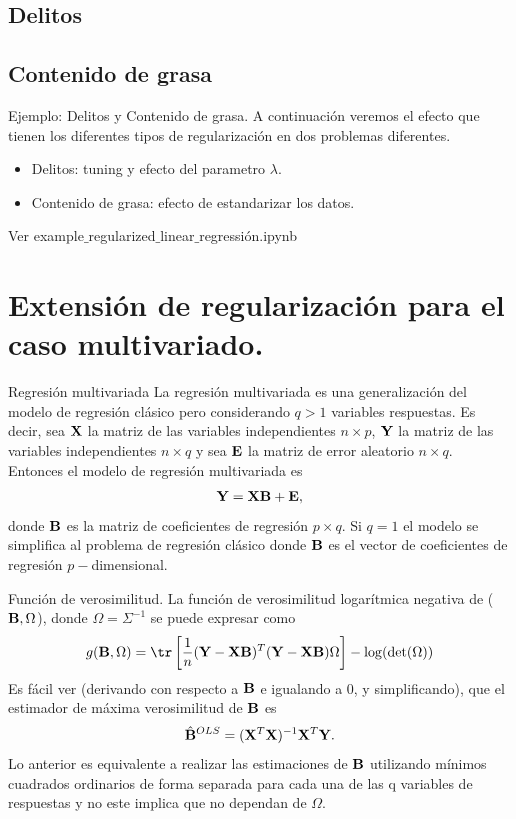 \subsection{Delitos}
\subsection{Contenido de grasa}
\begin{frame}{Ejemplo: Delitos y Contenido de grasa.}
A continuación veremos el efecto que tienen los diferentes tipos de regularización en dos problemas diferentes.
\begin{itemize}
    \item Delitos: tuning y efecto del parametro $\lambda$.
    \item Contenido de grasa: efecto de estandarizar los datos.
\end{itemize}
    \begin{cod}
    Ver example$\_$regularized$\_$linear$\_$regressión.ipynb
    \end{cod}
\end{frame}


\section{Extensión de regularización para el caso multivariado.}
\begin{frame}{Regresión multivariada}
La regresión multivariada es una generalización del modelo de regresión clásico pero considerando $q>1$ variables respuestas. Es decir, sea $\mathbf{X}$ la matriz de las variables independientes $n\times p$, $\mathbf{Y}$ la matriz de las variables independientes $n\times q$ y sea $\mathbf{E}$ la matriz de error aleatorio $n\times q$. Entonces el modelo de regresión multivariada es
\begin{align}
        \mathbf{Y} = \mathbf{X} \mathbf{B} +\mathbf{E},
\end{align}
donde $\mathbf{B}$ es la matriz de coeficientes de regresión $p\times q$. Si $q=1$ el modelo se simplifica al problema de regresión clásico donde $\mathbf{B}$ es el vector de coeficientes de regresión $p-$dimensional.
\end{frame}

\begin{frame}{Función de verosimilitud.}
La función de verosimilitud logarítmica negativa de ($\mathbf{B}, \Omega$), donde $\Omega = \Sigma^{-1}$ se puede expresar como 
\begin{align} \label{log_verosimilitud}
    g(\B,\Omega) = \tr \left[ \frac{1}{n}(\Y-\X\B)^T(\Y-\X\B)\Omega \right] -\log(\det(\Omega))
\end{align}
Es fácil ver (derivando con respecto a $\mathbf{B}$ e igualando a 0, y simplificando), que el estimador de máxima verosimilitud de $\mathbf{B}$ es 
\begin{align} \label{estimador_B_OLS}
    \hat{\mathbf{B}}^{OLS}=(\mathbf{X}^T\mathbf{X})^{-1}\mathbf{X}^T\mathbf{Y}.
\end{align}
Lo anterior es equivalente a realizar las estimaciones de $\mathbf{B}$ utilizando mínimos cuadrados ordinarios de forma separada para cada una de las q variables de respuestas y no este implica que no dependan  de $\Omega.$ 

\end{frame}

